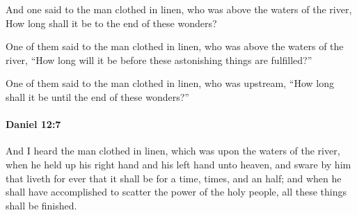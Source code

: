 			\begin{versebox}
					\item[BHS] 
					\item[LXX] 
					\item[ASV] And one said to the man clothed in linen, who was above the waters of the river, How long shall it be to the end of these wonders?
					\item[NIV] One of them said to the man clothed in linen, who was above the waters of the river, “How long will it be before these astonishing things are fulfilled?”
					\item[NRSV] One of them said to the man clothed in linen, who was upstream, “How long shall it be until the end of these wonders?”
			\end{versebox}

		\paragraph{Daniel 12:7} %
			\label{DANIEL-12-7}

			And I heard the man clothed in linen, which was upon the waters of the river, when he held up his right hand and his left hand unto heaven, and sware by him that liveth for ever that it shall be for a time, times, and an half; and when he shall have accomplished to scatter the power of the holy people, all these things shall be finished.

